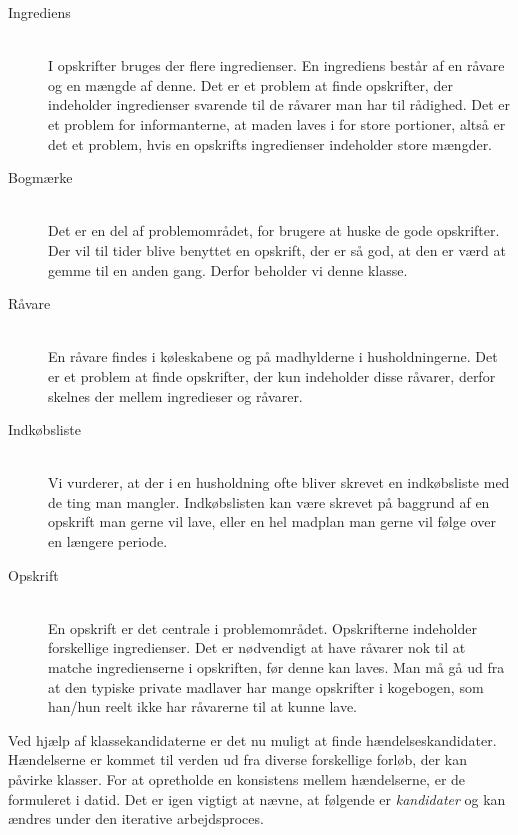 \begin{description}
\item[Ingrediens] \hfill \\ 
I opskrifter bruges der flere ingredienser. En ingrediens består af en råvare og en mængde af denne. Det er et problem at finde opskrifter, der indeholder ingredienser svarende til de råvarer man har til rådighed. Det er et problem for informanterne, at maden laves i for store portioner, altså er det et problem, hvis en opskrifts ingredienser indeholder store mængder.

\item[Bogmærke] \hfill \\
Det er en del af problemområdet, for brugere at huske de gode opskrifter. Der vil til tider blive benyttet en opskrift, der er så god, at den er værd at gemme til en anden gang. Derfor beholder vi denne klasse.

\item[Råvare] \hfill \\
En råvare findes i køleskabene og på madhylderne i husholdningerne. Det er et problem at finde opskrifter, der kun indeholder disse råvarer, derfor skelnes der mellem ingredieser og råvarer.

\item[Indkøbsliste] \hfill \\
Vi vurderer, at der i en husholdning ofte bliver skrevet en indkøbsliste med de ting man mangler. Indkøbslisten kan være skrevet på baggrund af en opskrift man gerne vil lave, eller en hel madplan man gerne vil følge over en længere periode.

\item[Opskrift] \hfill \\
En opskrift er det centrale i problemområdet. Opskrifterne indeholder forskellige ingredienser. Det er nødvendigt at have råvarer nok til at matche ingredienserne i opskriften, før denne kan laves. Man må gå ud fra at den typiske private madlaver har mange opskrifter i kogebogen, som han/hun reelt ikke har råvarerne til at kunne lave.
\end{description}

Ved hjælp af klassekandidaterne er det nu muligt at finde hændelseskandidater. Hændelserne er kommet til verden ud fra diverse forskellige forløb, der kan påvirke klasser. For at opretholde en konsistens mellem hændelserne, er de formuleret i datid. Det er igen vigtigt at nævne, at følgende er \emph{kandidater} og kan ændres under den iterative arbejdsproces. 

